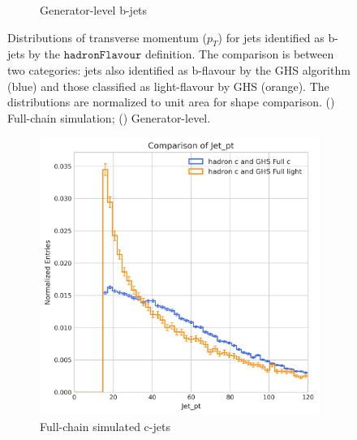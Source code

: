 \documentclass[10pt,twocolumn]{article}
\newcommand*{\hadFlav}{\texttt{hadronFlavour}}
\begin{document}
\begin{figure}[!htbp]
\begin{subfigure}[t]{0.48\textwidth}
        \caption{Generator-level b-jets}
        \label{fig:pt_b_hadron_gen}
    \end{subfigure}
    \caption{Distributions of transverse momentum ($p_T$) for jets identified as b-jets by the $\hadFlav$ definition. The comparison is between two categories: jets also identified as b-flavour by the GHS algorithm (blue) and those classified as light-flavour by GHS (orange). The distributions are normalized to unit area for shape comparison. () Full-chain simulation; () Generator-level.}
    \label{fig:pt_b_hadron_combined}
\end{figure}

\begin{figure}[!htbp]
    \centering
    \begin{subfigure}[t]{0.48\textwidth}
        \centering
        \includegraphics[width=\textwidth]{images/compare_pt_GHSFull_light_vs_c_filter_hadronFlavour_4.png}
        \caption{Full-chain simulated c-jets}
        \label{fig:pt_c_hadron_full}
    \end{subfigure}
    \hfill
    \begin{subfigure}[t]{0.48\textwidth}
        \centering

\end{subfigure}
\end{figure}
\end{document}
